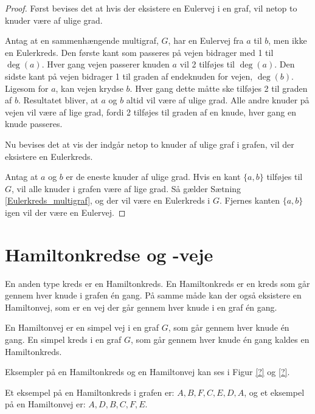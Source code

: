 \begin{proof}
	Først bevises det at hvis der eksistere en Eulervej i en graf, vil netop to knuder være af ulige grad. 

	Antag at en sammenhængende multigraf, $G$, har en Eulervej fra $a$ til $b$, men ikke en Eulerkreds. 
	Den første kant som passeres på vejen bidrager med 1 til $\deg(a)$. 
	Hver gang vejen passerer knuden $a$ vil 2 tilføjes til $\deg(a)$. 
	Den sidste kant på vejen bidrager 1 til graden af endeknuden for vejen, $\deg(b)$. 
	Ligesom for $a$, kan vejen krydse $b$. 
	Hver gang dette måtte ske tilføjes 2 til graden af $b$. 
	Resultatet bliver, at $a$ og $b$ altid vil være af ulige grad. 
	Alle andre knuder på vejen vil være af lige grad, fordi 2 tilføjes til graden af en knude, hver gang en knude passeres.  
	
	Nu bevises det at vis der indgår netop to knuder af ulige graf i grafen, vil der eksistere en Eulerkreds.

	Antag at $a$ og $b$ er de eneste knuder af ulige grad. 
	Hvis en kant $\lbrace a,b \rbrace$ tilføjes til $G$, vil alle knuder i grafen være af lige grad. 
	Så gælder Sætning \ref{Eulerkreds_multigraf}, og der vil være en Eulerkreds i $G$. 
	Fjernes kanten $\lbrace a,b \rbrace$ igen vil der være en Eulervej. 
\end{proof}

\section{Hamiltonkredse og -veje}
En anden type kreds er en Hamiltonkreds. 
En Hamiltonkreds er en kreds som går gennem hver knude i grafen én gang. På samme måde kan der også eksistere en Hamiltonvej, som er en vej der går gennem hver knude i en graf én gang. 

\begin{defn} \label{hamiltion_defn}
	En Hamiltonvej er en simpel vej i en graf $G$, som går gennem hver knude én gang.
	En simpel kreds i en graf $G$, som går gennem hver knude én gang kaldes en Hamiltonkreds.
\end{defn}

\begin{exmp}
	Eksempler på en Hamiltonkreds og en Hamiltonvej kan ses i Figur \ref{?} og \ref{?}.
	
	
	
	Et eksempel på en Hamiltonkreds i grafen er: $A,B,F,C,E,D,A$, og
	et eksempel på en Hamiltonvej er: $A,D,B,C,F,E$.
\end{exmp}

